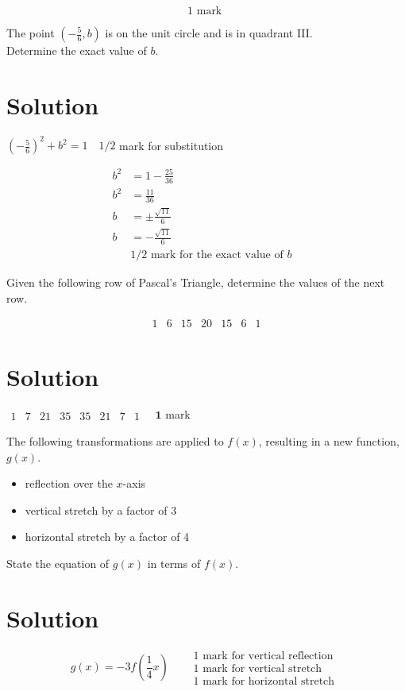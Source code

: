 \documentclass[10pt]{article}
\begin{document}
$$
1 \text { mark }
$$

The point $\left(-\frac{5}{6}, b\right)$ is on the unit circle and is in quadrant III.\\
Determine the exact value of $b$.

\section*{Solution}
$\left(-\frac{5}{6}\right)^{2}+b^{2}=1 \quad 1 / 2$ mark for substitution

$$
\begin{array}{rlr}
b^{2} & =1-\frac{25}{36} & \\
b^{2} & =\frac{11}{36} \\
b & = \pm \frac{\sqrt{11}}{6} & \\
b & =-\frac{\sqrt{11}}{6} & \\
& 1 / 2 \text { mark for the exact value of } b
\end{array}
$$

Given the following row of Pascal's Triangle, determine the values of the next row.

$$
\begin{array}{lllllll}
1 & 6 & 15 & 20 & 15 & 6 & 1
\end{array}
$$

\section*{Solution}
$\begin{array}{llllllll}1 & 7 & 21 & 35 & 35 & 21 & 7 & 1\end{array} \quad \mathbf{1}$ mark

The following transformations are applied to $f(x)$, resulting in a new function, $g(x)$.

\begin{itemize}
  \item reflection over the $x$-axis
  \item vertical stretch by a factor of 3
  \item horizontal stretch by a factor of 4
\end{itemize}

State the equation of $g(x)$ in terms of $f(x)$.

\section*{Solution}
$$
g(x)=-3 f\left(\frac{1}{4} x\right) \quad \begin{aligned}
& 1 \text { mark for vertical reflection } \\
& 1 \text { mark for vertical stretch } \\
& 1 \text { mark for horizontal stretch }
\end{aligned}
$$
\end{document}
